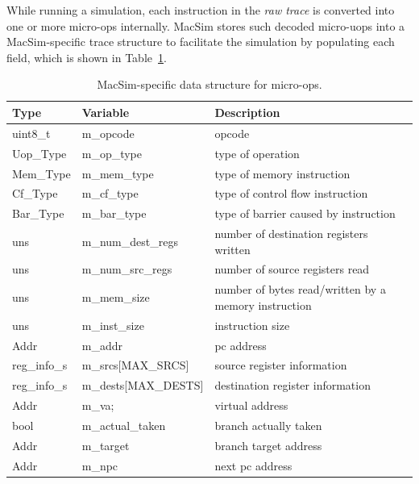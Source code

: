 While running a simulation, each instruction in the \emph{raw trace} is converted 
into one or more micro-ops internally. MacSim stores such decoded micro-uops into a MacSim-specific
trace structure to facilitate the simulation by populating each field, which is shown 
in Table~\ref{table:trace_uops}.

\begin{table}[htb]
\begin{footnotesize}
\begin{center}
\caption{MacSim-specific data structure for micro-ops.}
\label{table:trace_uops}
\begin{tabular}{|l|l|l|} 
\hline
Type      & Variable                 & Description \\ \hline 
uint8\_t  & m\_opcode                & opcode \\ \hline
Uop\_Type & m\_op\_type              & type of operation \\ \hline
Mem\_Type & m\_mem\_type             & type of memory instruction \\ \hline
Cf\_Type  & m\_cf\_type              & type of control flow instruction \\ \hline
Bar\_Type & m\_bar\_type             & type of barrier caused by instruction \\ \hline
uns       &   m\_num\_dest\_regs     & number of destination registers written \\ \hline
uns       &   m\_num\_src\_regs      & number of source registers read \\ \hline
uns       &   m\_mem\_size           & number of bytes read/written by a memory instruction \\ \hline
uns       &   m\_inst\_size          & instruction size \\ \hline
Addr      &   m\_addr                & pc address  \\ \hline
reg\_info\_s&   m\_srcs[MAX\_SRCS]   & source register information \\ \hline
reg\_info\_s&   m\_dests[MAX\_DESTS] & destination register information \\ \hline
Addr      &   m\_va;                 & virtual address \\ \hline
bool      &   m\_actual\_taken       & branch actually taken \\ \hline
Addr      &   m\_target              & branch target address \\ \hline
Addr      &   m\_npc                 & next pc address  \\ \hline

\end{tabular}
\end{center}
\end{footnotesize}
\end{table}
